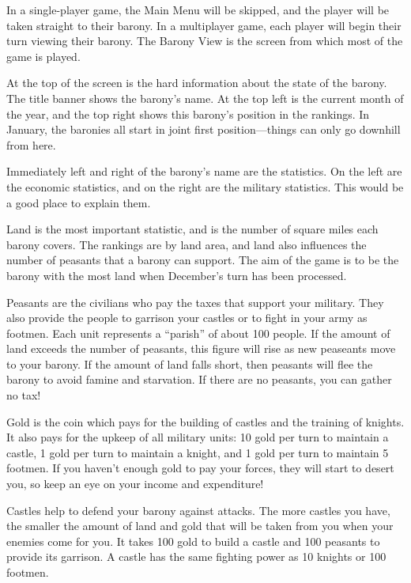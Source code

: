 \documentclass[8pt]{extarticle}
\begin{document}
\begin{multicols}{2}
\noindent
In a single-player game, the Main Menu will be skipped, and the player will be taken straight to their barony. In a multiplayer game, each player will begin their turn viewing their barony. The Barony View is the screen from which most of the game is played.

At the top of the screen is the hard information about the state of the barony. The title banner shows the barony's name. At the top left is the current month of the year, and the top right shows this barony's position in the rankings. In January, the baronies all start in joint first position---things can only go downhill from here.

Immediately left and right of the barony's name are the statistics. On the left are the economic statistics, and on the right are the military statistics. This would be a good place to explain them.

Land is the most important statistic, and is the number of square miles each barony covers. The rankings are by land area, and land also influences the number of peasants that a barony can support. The aim of the game is to be the barony with the most land when December's turn has been processed.

Peasants are the civilians who pay the taxes that support your military. They also provide the people to garrison your castles or to fight in your army as footmen. Each unit represents a ``parish'' of about 100 people. If the amount of land exceeds the number of peasants, this figure will rise as new peaseants move to your barony. If the amount of land falls short, then peasants will flee the barony to avoid famine and starvation. If there are no peasants, you can gather no tax!

Gold is the coin which pays for the building of castles and the training of knights. It also pays for the upkeep of all military units: 10 gold per turn to maintain a castle, 1 gold per turn to maintain a knight, and 1 gold per turn to maintain 5 footmen. If you haven't enough gold to pay your forces, they will start to desert you, so keep an eye on your income and expenditure!

Castles help to defend your barony against attacks. The more castles you have, the smaller the amount of land and gold that will be taken from you when your enemies come for you. It takes 100 gold to build a castle and 100 peasants to provide its garrison. A castle has the same fighting power as 10 knights or 100 footmen.


\end{multicols}
\end{document}
